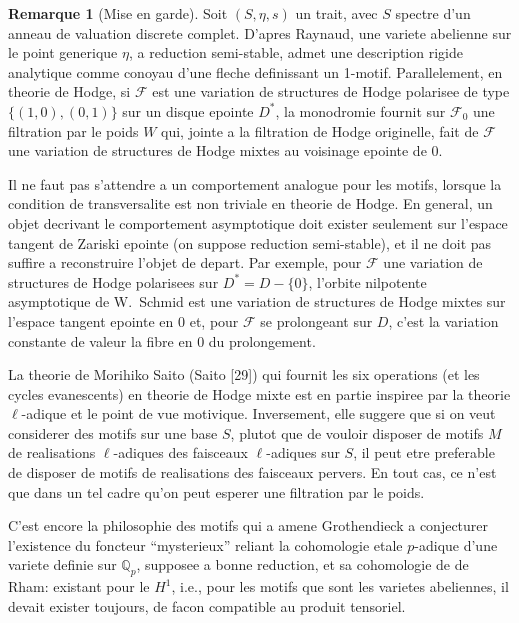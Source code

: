 \documentclass[11pt,a4paper]{article}
\theoremstyle{plain}
\theoremstyle{definition}
\newtheorem{remark}[theorem]{Remarque}
\newcommand{\Q}{\mathbb{Q}}
\begin{document}
\begin{remark}[Mise en garde]
Soit $(S, \eta, s)$ un trait, avec $S$ spectre d'un anneau de valuation discrete complet. D'apres Raynaud, une variete abelienne sur le point generique $\eta$, a reduction semi-stable, admet une description rigide analytique comme conoyau d'une fleche definissant un 1-motif. Parallelement, en theorie de Hodge, si $\mathscr{F}$ est une variation de structures de Hodge polarisee de type $\{(1,0), (0,1)\}$ sur un disque epointe $D^*$, la monodromie fournit sur $\mathscr{F}_0$ une filtration par le poids $W$ qui, jointe a la filtration de Hodge originelle, fait de $\mathscr{F}$ une variation de structures de Hodge mixtes au voisinage epointe de $0$.

Il ne faut pas s'attendre a un comportement analogue pour les motifs, lorsque la condition de transversalite est non triviale en theorie de Hodge. En general, un objet decrivant le comportement asymptotique doit exister seulement sur l'espace tangent de Zariski epointe (on suppose reduction semi-stable), et il ne doit pas suffire a reconstruire l'objet de depart. Par exemple, pour $\mathscr{F}$ une variation de structures de Hodge polarisees sur $D^* = D - \{0\}$, l'orbite nilpotente asymptotique de W.~Schmid est une variation de structures de Hodge mixtes sur l'espace tangent epointe en $0$ et, pour $\mathscr{F}$ se prolongeant sur $D$, c'est la variation constante de valeur la fibre en $0$ du prolongement.

La theorie de Morihiko Saito (Saito [29]) qui fournit les six operations (et les cycles evanescents) en theorie de Hodge mixte est en partie inspiree par la theorie $\ell$-adique et le point de vue motivique. Inversement, elle suggere que si on veut considerer des motifs sur une base $S$, plutot que de vouloir disposer de motifs $M$ de realisations $\ell$-adiques des faisceaux $\ell$-adiques sur $S$, il peut etre preferable de disposer de motifs de realisations des faisceaux pervers. En tout cas, ce n'est que dans un tel cadre qu'on peut esperer une filtration par le poids.
\end{remark}

C'est encore la philosophie des motifs qui a amene Grothendieck a conjecturer l'existence du foncteur ``mysterieux'' reliant la cohomologie etale $p$-adique d'une variete definie sur $\Q_p$, supposee a bonne reduction, et sa cohomologie de de Rham: existant pour le $H^1$, i.e., pour les motifs que sont les varietes abeliennes, il devait exister toujours, de facon compatible au produit tensoriel.
\end{document}
